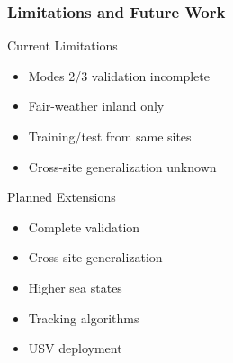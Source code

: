 \documentclass[aspectratio=169, 10pt]{beamer}
\begin{document}
\begin{frame}[shrink=40]
  \frametitle{Limitations and Future Work}
  \vspace{-0.45cm}

  \begin{alertblock}{Current Limitations}
    \scriptsize
    \setlength{\itemsep}{0pt}
    \setlength{\parskip}{0pt}
    \begin{itemize}
      \item Modes 2/3 validation incomplete
      \item Fair-weather inland only
      \item Training/test from same sites
      \item Cross-site generalization unknown
    \end{itemize}
  \end{alertblock}
  \vspace{-0.15cm}

  \begin{exampleblock}{Planned Extensions}
    \scriptsize
    \setlength{\itemsep}{0pt}
    \setlength{\parskip}{0pt}
    \begin{itemize}
      \item Complete validation
      \item Cross-site generalization
      \item Higher sea states
      \item Tracking algorithms
      \item USV deployment
    \end{itemize}
  \end{exampleblock}
\end{frame}
\end{document}
